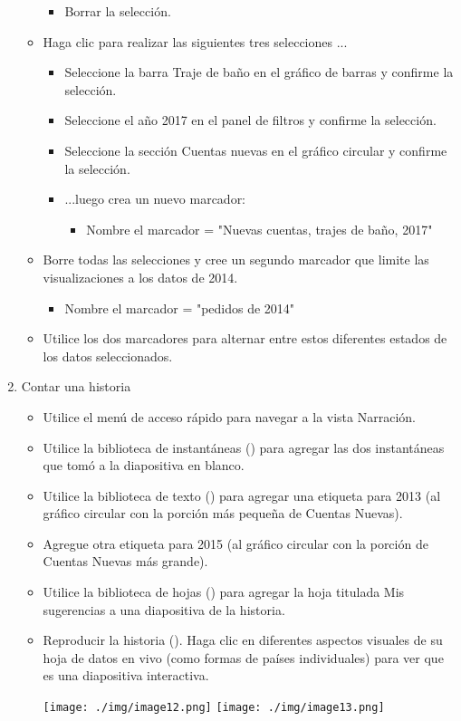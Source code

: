 \documentclass[12pt,letterpaper]{article}
\begin{document}
\begin{enumerate}
\begin{itemize}
        \begin{itemize}  
            \item Borrar la selección.
        \end{itemize} 
        \item Haga clic para realizar las siguientes tres selecciones ...
        \begin{itemize}  
            \item Seleccione la barra Traje de baño en el gráfico de barras y confirme la selección.
            \item Seleccione el año 2017 en el panel de filtros y confirme la selección.
            \item Seleccione la sección Cuentas nuevas en el gráfico circular y confirme la selección.
            \item ...luego crea un nuevo marcador:
            \begin{itemize}  
                \item Nombre el marcador = "Nuevas cuentas, trajes de baño, 2017"
            \end{itemize} 
        \end{itemize} 
        \item Borre todas las selecciones y cree un segundo marcador que limite las visualizaciones a los datos de 2014.
        \begin{itemize}  
            \item Nombre el marcador = "pedidos de 2014"
        \end{itemize}
        \item Utilice los dos marcadores para alternar entre estos diferentes estados de los datos seleccionados.
    \end{itemize} 
    \item Contar una historia
    \begin{itemize}  
        \item Utilice el menú de acceso rápido para navegar a la vista Narración.
        \item Utilice la biblioteca de instantáneas () para agregar las dos instantáneas que tomó a la diapositiva en blanco.
        \item Utilice la biblioteca de texto () para agregar una etiqueta para 2013 (al gráfico circular con la porción más pequeña de Cuentas Nuevas).
        \item Agregue otra etiqueta para 2015 (al gráfico circular con la porción de Cuentas Nuevas más grande).
        \item Utilice la biblioteca de hojas () para agregar la hoja titulada Mis sugerencias a una diapositiva de la historia.
        \item Reproducir la historia (). Haga clic en diferentes aspectos visuales de su hoja de datos en vivo (como formas de países individuales) para ver que es una diapositiva interactiva.
        \begin{center}
            \texttt{[image: ./img/image12.png]}
            \texttt{[image: ./img/image13.png]}  
        \end{center}
    \end{itemize}
    

\end{enumerate}
\end{document}
